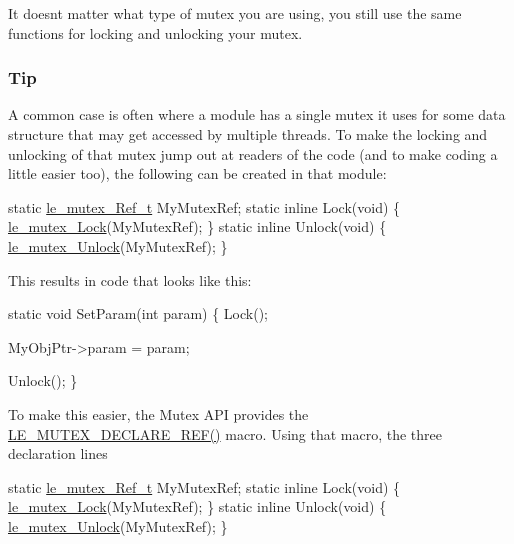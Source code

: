 It doesn\textquotesingle{}t matter what type of mutex you are using, you still use the same functions for locking and unlocking your mutex.\hypertarget{c_mutex_c_mutex_locking_tips}{}\subsubsection{Tip}\label{c_mutex_c_mutex_locking_tips}
A common case is often where a module has a single mutex it uses for some data structure that may get accessed by multiple threads. To make the locking and unlocking of that mutex jump out at readers of the code (and to make coding a little easier too), the following can be created in that module\+:


\begin{DoxyCode}
\textcolor{keyword}{static} \hyperlink{le__mutex_8h_ab2af11e2077e6bed9962eb7dfd54eb03}{le\_mutex\_Ref\_t} MyMutexRef;
\textcolor{keyword}{static} \textcolor{keyword}{inline} Lock(\textcolor{keywordtype}{void}) \{ \hyperlink{le__mutex_8h_ad5b7d94710f420cd945229648e7a80e7}{le\_mutex\_Lock}(MyMutexRef); \}
\textcolor{keyword}{static} \textcolor{keyword}{inline} Unlock(\textcolor{keywordtype}{void}) \{ \hyperlink{le__mutex_8h_aae68b71222e20c55ff3bf2d7b52e3009}{le\_mutex\_Unlock}(MyMutexRef); \}
\end{DoxyCode}


This results in code that looks like this\+:


\begin{DoxyCode}
\textcolor{keyword}{static} \textcolor{keywordtype}{void} SetParam(\textcolor{keywordtype}{int} param)
\{
    Lock();

    MyObjPtr->param = param;

    Unlock();
\}
\end{DoxyCode}


To make this easier, the Mutex A\+P\+I provides the \hyperlink{le__mutex_8h_a7bada3ca8908be93ba5b393e460f6e80}{L\+E\+\_\+\+M\+U\+T\+E\+X\+\_\+\+D\+E\+C\+L\+A\+R\+E\+\_\+\+R\+E\+F()} macro. Using that macro, the three declaration lines


\begin{DoxyCode}
\textcolor{keyword}{static} \hyperlink{le__mutex_8h_ab2af11e2077e6bed9962eb7dfd54eb03}{le\_mutex\_Ref\_t} MyMutexRef;
\textcolor{keyword}{static} \textcolor{keyword}{inline} Lock(\textcolor{keywordtype}{void}) \{ \hyperlink{le__mutex_8h_ad5b7d94710f420cd945229648e7a80e7}{le\_mutex\_Lock}(MyMutexRef); \}
\textcolor{keyword}{static} \textcolor{keyword}{inline} Unlock(\textcolor{keywordtype}{void}) \{ \hyperlink{le__mutex_8h_aae68b71222e20c55ff3bf2d7b52e3009}{le\_mutex\_Unlock}(MyMutexRef); \}
\end{DoxyCode}


